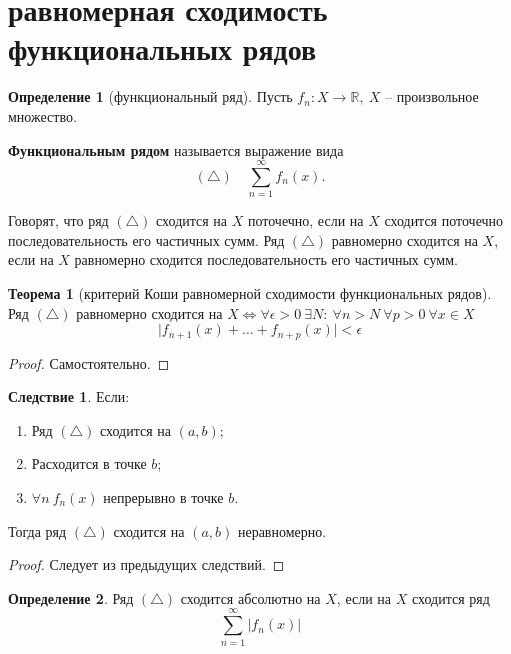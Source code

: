 \documentclass{report}
\theoremstyle{definition}
\newtheorem{definition}{Определение}[section]
\newtheorem*{effect}{Следствие}
\newtheorem{theorem}{Теорема}[section]
\begin{document}
\section{равномерная сходимость функциональных рядов}

\begin{definition}[функциональный ряд]
  Пусть $f_n: X \rightarrow\mathbb{R}, \ X$ -- произвольное множество.

  \textbf{Функциональным рядом} называется выражение вида
  \begin{equation*}
    (\triangle)\quad \sum_{n=1}^{\infty}f_n(x).
  \end{equation*}

  Говорят, что ряд $(\triangle)$ сходится на $X$ поточечно, если на $X$ сходится поточечно последовательность его частичных сумм. Ряд $(\triangle)$ равномерно сходится на $X$, если на $X$ равномерно сходится последовательность его частичных сумм.
\end{definition}

\begin{theorem}[критерий Коши равномерной сходимости функциональных рядов]
  Ряд $(\triangle)$ равномерно сходится на $X \iff \forall \epsilon > 0 \ \exists N: \ \forall n > N \ \forall p > 0 \ \forall x \in X$
  \begin{equation*}
    \big|f_{n+1}(x) + \ldots + f_{n+p}(x)\big| < \epsilon
  \end{equation*}
\end{theorem}

\begin{proof}
  Самостоятельно.
\end{proof}

\begin{effect}
  Если:
  \begin{enumerate}
    \item Ряд $(\triangle)$ сходится на $(a,b)$;
    \item Расходится в точке $b$;
    \item $\forall n \ f_n(x)$ непрерывно в точке $b$.
  \end{enumerate}

  Тогда ряд $(\triangle)$ сходится на $(a,b)$ неравномерно.
\end{effect}

\begin{proof}
  Следует из предыдущих следствий.
\end{proof}

\begin{definition}
  Ряд $(\triangle)$ сходится абсолютно на $X$, если на $X$ сходится ряд
  \begin{equation*}
    \sum_{n=1}^{\infty}\big|f_n(x)\big|
  \end{equation*}
\end{definition}
\end{document}
